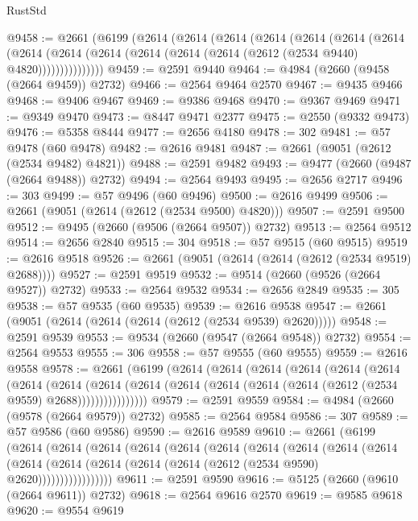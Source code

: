 \begin{lexlean}{RustStd}
\begin{coremodule}
@9458 := @2661
    (@6199
      (@2614
        (@2614
          (@2614
            (@2614
              (@2614
                (@2614
                  (@2614
                    (@2614
                      (@2614 (@2614 (@2614 (@2614 (@2614 (@2612 (@2534 @9440) @4820)))))))))))))))
@9459 := @2591 @9440
@9464 := @4984 (@2660 (@9458 (@2664 @9459)) @2732)
@9466 := @2564 @9464 @2570
@9467 := @9435 @9466
@9468 := @9406 @9467
@9469 := @9386 @9468
@9470 := @9367 @9469
@9471 := @9349 @9470
@9473 := @8447 @9471 @2377
@9475 := @2550 (@9332 @9473)
@9476 := @5358 @8444
@9477 := @2656 @4180
@9478 := 302
@9481 := @57 @9478 (@60 @9478)
@9482 := @2616 @9481
@9487 := @2661 (@9051 (@2612 (@2534 @9482) @4821))
@9488 := @2591 @9482
@9493 := @9477 (@2660 (@9487 (@2664 @9488)) @2732)
@9494 := @2564 @9493
@9495 := @2656 @2717
@9496 := 303
@9499 := @57 @9496 (@60 @9496)
@9500 := @2616 @9499
@9506 := @2661 (@9051 (@2614 (@2612 (@2534 @9500) @4820)))
@9507 := @2591 @9500
@9512 := @9495 (@2660 (@9506 (@2664 @9507)) @2732)
@9513 := @2564 @9512
@9514 := @2656 @2840
@9515 := 304
@9518 := @57 @9515 (@60 @9515)
@9519 := @2616 @9518
@9526 := @2661 (@9051 (@2614 (@2614 (@2612 (@2534 @9519) @2688))))
@9527 := @2591 @9519
@9532 := @9514 (@2660 (@9526 (@2664 @9527)) @2732)
@9533 := @2564 @9532
@9534 := @2656 @2849
@9535 := 305
@9538 := @57 @9535 (@60 @9535)
@9539 := @2616 @9538
@9547 := @2661 (@9051 (@2614 (@2614 (@2614 (@2612 (@2534 @9539) @2620)))))
@9548 := @2591 @9539
@9553 := @9534 (@2660 (@9547 (@2664 @9548)) @2732)
@9554 := @2564 @9553
@9555 := 306
@9558 := @57 @9555 (@60 @9555)
@9559 := @2616 @9558
@9578 := @2661
    (@6199
      (@2614
        (@2614
          (@2614
            (@2614
              (@2614
                (@2614
                  (@2614
                    (@2614
                      (@2614
                        (@2614
                          (@2614 (@2614 (@2614 (@2614 (@2612 (@2534 @9559) @2688))))))))))))))))
@9579 := @2591 @9559
@9584 := @4984 (@2660 (@9578 (@2664 @9579)) @2732)
@9585 := @2564 @9584
@9586 := 307
@9589 := @57 @9586 (@60 @9586)
@9590 := @2616 @9589
@9610 := @2661
    (@6199
      (@2614
        (@2614
          (@2614
            (@2614
              (@2614
                (@2614
                  (@2614
                    (@2614
                      (@2614
                        (@2614
                          (@2614
                            (@2614 (@2614 (@2614 (@2614 (@2612 (@2534 @9590) @2620)))))))))))))))))
@9611 := @2591 @9590
@9616 := @5125 (@2660 (@9610 (@2664 @9611)) @2732)
@9618 := @2564 @9616 @2570
@9619 := @9585 @9618
@9620 := @9554 @9619

\end{coremodule}
\end{lexlean}
